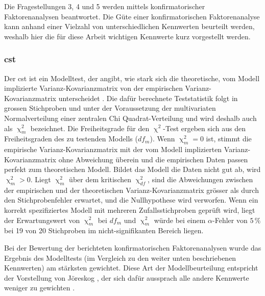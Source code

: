 \documentclass[11pt, twoside, a4paper]{book}		%
\begin{document}
Die Fragestellungen 3, 4 und 5 werden mittels konfirmatorischer Faktorenanalysen beantwortet. Die Güte einer konfirmatorischen Faktorenanalyse kann anhand einer Vielzahl von unterschiedlichen Kennwerten beurteilt werden, weshalb hier die für diese Arbeit wichtigen Kennwerte kurz vorgestellt werden.










\subsubsection*{\gls{cst}}

Der \gls{cst} ist ein Modelltest, der angibt, wie stark sich die theoretische, vom Modell implizierte Var\-ianz-Ko\-var\-ianz\-ma\-trix von der empirischen Var\-ianz-Ko\-var\-ianz\-ma\-trix unterscheidet \citep{Kline2011}. Die dafür berechnete Teststatistik folgt in grossen Stichproben und unter der Voraussetzung der multivariaten Normalverteilung einer zentralen Chi Quad\-rat-Ver\-teil\-ung und wird deshalb auch als $\upchi^2_{m}$ bezeichnet. Die Freiheitsgrade für den $\upchi^2$-Test ergeben sich aus den Freiheitsgraden des zu testenden Modells ($df_{m}$). Wenn $\upchi^2_{m}=0$ ist, stimmt die empirische Var\-ianz-Ko\-var\-ianz\-ma\-trix mit der vom Modell implizierten Varianz-Kovarianzmatrix ohne Abweichung überein und die empirischen Daten passen perfekt zum theoretischen Modell. Bildet das Modell die Daten nicht gut ab, wird $\upchi^2_{m}>0$. Liegt $\upchi^2_{m}$ über dem kritischen $\upchi^2_{df}$, sind die Abweichungen zwischen der empirischen und der theoretischen Varianz-Kovarianzmatrix grösser als durch den Stichprobenfehler erwartet, und die Nullhypothese wird verworfen. Wenn ein korrekt spezifiziertes Modell mit mehreren Zufallsstichproben geprüft wird, liegt der Erwartungswert von $\upchi^2_{m}$ bei $df_{m}$ und $\upchi^2_{m}$ würde bei einem $\alpha$-Fehler von $5\,\%$ bei 19 von 20 Stichproben im nicht-signifikanten Bereich liegen.

Bei der Bewertung der berichteten konfirmatorischen Faktorenanalysen wurde das Ergebnis des Modelltests (im Vergleich zu den weiter unten beschriebenen Kennwerten) am stärksten gewichtet. Diese Art der Modellbeurteilung entspricht der Vorstellung von Jöreskog \citep[1985, zitiert nach][S. 1620]{McIntosh2012}, der sich dafür aussprach alle andere Kennwerte weniger zu gewichten \citep[siehe auch][]{Hayduk2007}.
\end{document}
